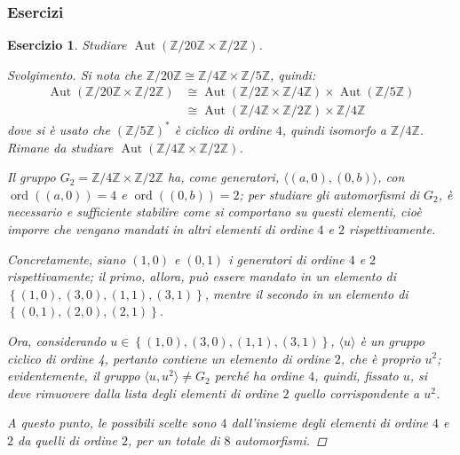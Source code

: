 \documentclass[11pt]{scrartcl}
\theoremstyle{style1}
\newtheorem{esercizio}{Esercizio}[section]
\newenvironment{svolgimento}{\renewcommand\qedsymbol{$\blacksquare$}\begin{proof}[Svolgimento]}{\end{proof}}
\numberwithin{equation}{subsection}
\begin{document}
\subsubsection{Esercizi}
\begin{esercizio}
Studiare $\operatorname{Aut} (\mathbb{Z} / 20 \mathbb{Z} \times \mathbb{Z} / 2 \mathbb{Z})$.
\begin{svolgimento}
	Si nota che $\mathbb{Z} / 20 \mathbb{Z}\cong \mathbb{Z}/4 \mathbb{Z} \times  \mathbb{Z} / 5 \mathbb{Z}$, quindi:
	\[
		\begin{split}
			\operatorname{Aut} (\mathbb{Z}/20\mathbb{Z}\times \mathbb{Z}/2\mathbb{Z})&\cong \operatorname{Aut} (\mathbb{Z}/2\mathbb{Z} \times \mathbb{Z} / 4\mathbb{Z}) \times \operatorname{Aut} (\mathbb{Z}/5\mathbb{Z}) \\
												 &\cong\operatorname{Aut} (\mathbb{Z}/4\mathbb{Z}\times \mathbb{Z}/2\mathbb{Z}) \times \mathbb{Z}/4\mathbb{Z}
		\end{split}
	\] 
	dove si \`e usato che $(\mathbb{Z}/5\mathbb{Z})^*$ \`e ciclico di ordine $4$, quindi isomorfo a $\mathbb{Z}/4\mathbb{Z}$.
	Rimane da studiare $\operatorname{Aut} (\mathbb{Z}/4\mathbb{Z}\times \mathbb{Z}/2\mathbb{Z})$.

	Il gruppo $G_2 = \mathbb{Z}/4\mathbb{Z} \times  \mathbb{Z}/2\mathbb{Z}$ ha, come generatori, $\langle (a,0),(0,b) \rangle$, con $\operatorname{ord}((a,0)) = 4$ e $\operatorname{ord}((0,b)) =2$; per studiare gli automorfismi di $G_2$, \`e necessario e sufficiente stabilire come si comportano su questi elementi, cio\`e imporre che vengano mandati in altri elementi di ordine $4$ e $2 $ rispettivamente.

	Concretamente, siano $(1,0)$ e $(0,1)$ i generatori di ordine $4$ e $2 $ rispettivamente; il primo, allora, pu\`o essere mandato in un elemento di $\left\{ (1,0), (3,0),(1,1),(3,1) \right\} $, mentre il secondo in un elemento di $\left\{ (0,1), (2,0) , (2,1) \right\} $.

	Ora, considerando $u \in \left\{ (1,0), (3,0),(1,1),(3,1) \right\} $, $\langle u \rangle$ \`e un gruppo ciclico di ordine 4, pertanto contiene un elemento di ordine $2$, che \`e proprio $u^2$; evidentemente, il gruppo $\langle u,u^2 \rangle\neq G_2$ perch\'e ha ordine $4$, quindi, fissato $u$, si deve rimuovere dalla lista degli elementi di ordine $2$ quello corrispondente a $u^2$.

	A questo punto, le possibili scelte sono $4$ dall'insieme degli elementi di ordine $4$ e $2 $ da quelli di ordine $2$, per un totale di $8$ automorfismi.


\end{svolgimento}
\end{esercizio}
\end{document}
